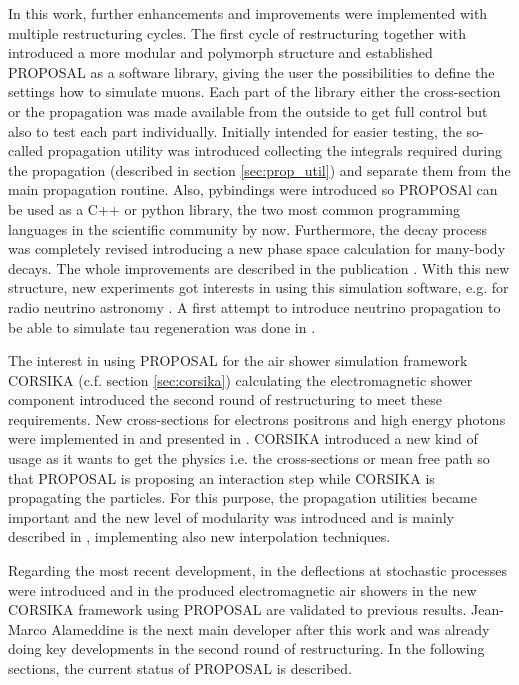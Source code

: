 In this work, further enhancements and improvements were implemented with multiple restructuring cycles.
The first cycle of restructuring together with \cite{Dunsch18Master} introduced a more modular and polymorph structure and established PROPOSAL as a software library, giving the user the possibilities to define the settings how to simulate muons.
Each part of the library either the cross-section or the propagation was made available from the outside to get full control but also to test each part individually.
Initially intended for easier testing, the so-called propagation utility was introduced collecting the integrals required during the propagation (described in section \ref{sec:prop_util}) and separate them from the main propagation routine.
Also, pybindings were introduced so PROPOSAl can be used as a C++ or python library, the two most common programming languages in the scientific community by now.
Furthermore, the decay process was completely revised introducing a new phase space calculation for many-body decays.
The whole improvements are described in the publication \cite{Dunsch19PROPOSAL}.
With this new structure, new experiments got interests in using this simulation software, e.g. for radio neutrino astronomy \cite{Glaser20nuRadioMC}.
A first attempt to introduce neutrino propagation to be able to simulate tau regeneration was done in \cite{Franz20Bachelor}.

The interest in using PROPOSAL for the air shower simulation framework CORSIKA (c.f. section \ref{sec:corsika}) calculating the electromagnetic shower component introduced the second round of restructuring to meet these requirements.
New cross-sections for electrons positrons and high energy photons were implemented in \cite{Alameddine20Master} and presented in \cite{Alameddine20PROPOSAL}.
CORSIKA introduced a new kind of usage as it wants to get the physics i.e. the cross-sections or mean free path so that PROPOSAL is proposing an interaction step while CORSIKA is propagating the particles.
For this purpose, the propagation utilities became important and the new level of modularity was introduced and is mainly described in \cite{Sackel21Master}, implementing also new interpolation techniques.

Regarding the most recent development, in \cite{Gutjahr21Master} the deflections at stochastic processes were introduced and in \cite{Bollmann21Bachelor} the produced electromagnetic air showers in the new CORSIKA framework using PROPOSAL are validated to previous results.
Jean-Marco Alameddine is the next main developer after this work and was already doing key developments in the second round of restructuring.
In the following sections, the current status of PROPOSAL is described.

